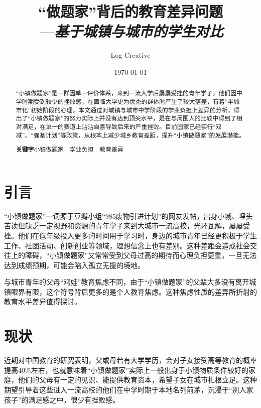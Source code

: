 \documentclass[10pt,a4paper,heading=false]{ctexart}
\begin{document}
    \title{\vspace{-3cm}“做题家”背后的教育差异问题
    \\\hspace*{15ex}\emph{\Large---基于城镇与城市的学生对比}
    }
    \author{Log Creative}
    \date{\today}
    \maketitle
    \begin{abstract}
        “小镇做题家”是一群因单一评价体系，来到一流大学后屡屡受挫的青年学子。他们因中学时期受到较少的挫败感，在面临大学更为优秀的群体时产生了较大落差，有着“半城市化”初始阶段的心理。本文通过对城镇与城市中学阶段的学业负担上差异的分析，得出了“小镇做题家”的努力实际上并没有达到顶尖水平，是在与周围人的比较中得到了相对满足，在单一的赛道上沾沾自喜导致后来的严重挫败。目前国家已经实行“双减”、“强基计划”等政策，从根本上减少城乡教育差距，提升“小镇做题家”的发展潜能。

        \textbf{关键字}\quad 小镇做题家~~学业负担~~教育差异
    \end{abstract}
    \section{引言}
    “小镇做题家”一词源于豆瓣小组“985废物引进计划”的网友发帖，出身小城、埋头苦读但缺乏一定视野和资源的青年学子来到大城市一流高校，光环瓦解，屡屡受挫。\cite{solver}他们在低年级投入更多的时间用于学习时，身边的城市青年已经更积极于学生工作、社团活动、创新创业等领域，理想信念上也有差别。这种差距会造成社会交往上的障碍，“小镇做题家”又常常受到父母过高的期待而心理负担更重，一旦无法达到成绩预期，可能会陷入孤立无援的境地。\cite{solveranalysis}

    与城市青年的父母“鸡娃”教育焦虑不同，由于“小镇做题家”的父辈大多没有离开城镇眼界有限，这个符号背后更多的是个人教育焦虑。这种焦虑性质的差异所折射的教育水平差异值得探讨。
    \section{现状}
    近期对中国教育的研究表明，父或母若有大学学历，会对子女接受高等教育的概率提高40\%左右\cite{familyedu}，也就意味着“小镇做题家”实际上一般出身于小镇物质条件较好的家庭，他们的父母有一定的见识、能提供教育资本，希望子女在城市扎根立足。这种期望引导着这些进入一流高校的他们在中学时期于本地名列前茅，沉浸于“别人家孩子”的满足感之中，很少有挫败感。
\end{document}
